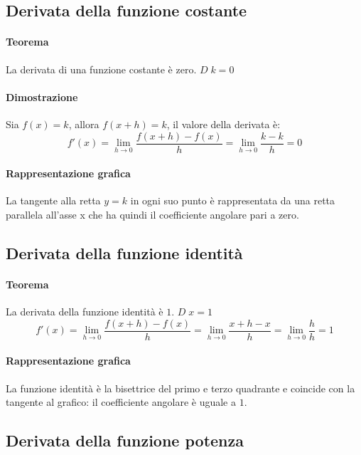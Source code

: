 \documentclass[a4paper,14pt]{extarticle}
\begin{document}
\subsection{Derivata della funzione costante}
\paragraph{Teorema \\} La derivata di una funzione costante è zero. $D\;k = 0$
\paragraph{Dimostrazione \\} Sia $f(x) = k$, allora $f(x+h) = k$, il valore della derivata è: \large \[ f'(x) = \lim_{h\to0}\frac{f(x+h)-f(x)}{h} = \lim_{h\to0}\frac{k-k}{h} = 0 \] \normalsize

\paragraph{Rappresentazione grafica \\}
La tangente alla retta $y=k$ in ogni suo punto è rappresentata da una retta parallela all'asse x che ha quindi il coefficiente angolare pari a zero.

\subsection{Derivata della funzione identità}
\paragraph{Teorema \\} La derivata della funzione identità è $1$. $D\;x = 1$
\large \[ f'(x) = \lim_{h\to0}\frac{f(x+h)-f(x)}{h} = \lim_{h\to0}\frac{x+h-x}{h} = \lim_{h\to0}\frac{h}{h} = 1\] \normalsize


\paragraph{Rappresentazione grafica \\}
La funzione identità è la bisettrice del primo e terzo quadrante e coincide con la tangente al grafico: il coefficiente angolare è uguale a $1$.

\subsection{Derivata della funzione potenza}
\end{document}
